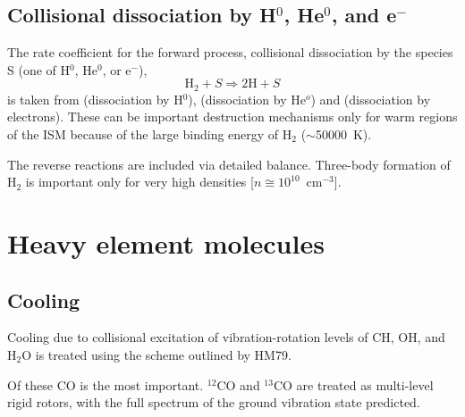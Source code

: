 \subsection{Collisional dissociation by H$^0$, He$^0$, and e$^-$}

The rate coefficient for the forward process, collisional dissociation
by the species S (one of H$^0$, He$^0$, or e$^-$),
\begin{equation}
{{\mathrm{H}}_2} + S \Rightarrow 2{\mathrm{H}} + S
\end{equation}
is taken from \citet{Dove1986} (dissociation by H$^0$),
\citet{Dove1987} (dissociation by He$^o$) and \citet{Janev1987} (dissociation by electrons).
These can be important destruction mechanisms only for warm regions of the
ISM because of the large binding energy of H$_2$ ($\sim$50000~K).

The reverse reactions are included via detailed balance. Three-body
formation of H$_2$ is important only for very high densities [$n\cong
10^{10}$~cm$^{-3}$].

\section{Heavy element molecules}

\subsection{Cooling}

Cooling due to collisional excitation of vibration-rotation levels of
CH, OH, and H$_2$O is treated using the scheme outlined by HM79.

Of these CO is the most important. $^{12}$CO and $^{13}$CO are treated as
multi-level rigid rotors, with the full spectrum of the ground vibration
state predicted.


